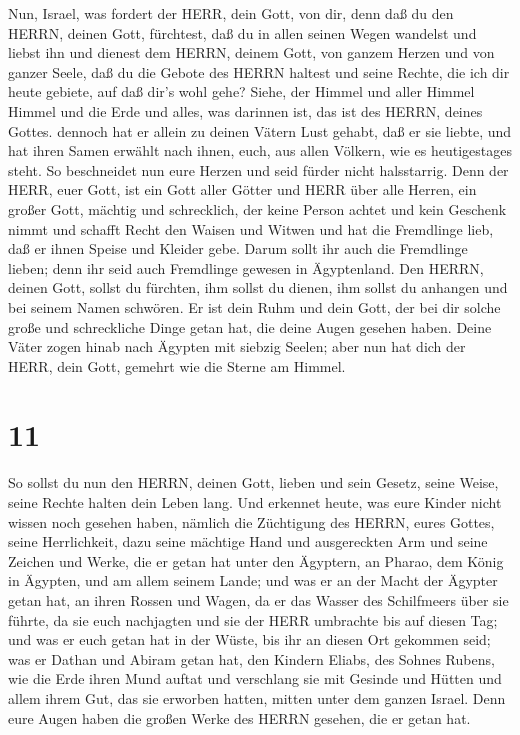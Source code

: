  Nun, Israel, was fordert der HERR, dein Gott, von dir,
denn daß du den HERRN, deinen Gott, fürchtest, daß du in allen seinen
Wegen wandelst und liebst ihn und dienest dem HERRN, deinem Gott, von
ganzem Herzen und von ganzer Seele,  daß du die Gebote des
HERRN haltest und seine Rechte, die ich dir heute gebiete, auf daß dir's
wohl gehe?  Siehe, der Himmel und aller Himmel Himmel und
die Erde und alles, was darinnen ist, das ist des HERRN, deines Gottes.
 dennoch hat er allein zu deinen Vätern Lust gehabt, daß er
sie liebte, und hat ihren Samen erwählt nach ihnen, euch, aus allen
Völkern, wie es heutigestages steht.  So beschneidet nun
eure Herzen und seid fürder nicht halsstarrig.  Denn der
HERR, euer Gott, ist ein Gott aller Götter und HERR über alle Herren,
ein großer Gott, mächtig und schrecklich, der keine Person achtet und
kein Geschenk nimmt  und schafft Recht den Waisen und
Witwen und hat die Fremdlinge lieb, daß er ihnen Speise und Kleider
gebe.  Darum sollt ihr auch die Fremdlinge lieben; denn ihr
seid auch Fremdlinge gewesen in Ägyptenland.  Den HERRN,
deinen Gott, sollst du fürchten, ihm sollst du dienen, ihm sollst du
anhangen und bei seinem Namen schwören.  Er ist dein Ruhm
und dein Gott, der bei dir solche große und schreckliche Dinge getan
hat, die deine Augen gesehen haben.  Deine Väter zogen
hinab nach Ägypten mit siebzig Seelen; aber nun hat dich der HERR, dein
Gott, gemehrt wie die Sterne am Himmel.

\hypertarget{section-10}{%
\section{11}\label{section-10}}

 So sollst du nun den HERRN, deinen Gott, lieben und sein
Gesetz, seine Weise, seine Rechte halten dein Leben lang. 
Und erkennet heute, was eure Kinder nicht wissen noch gesehen haben,
nämlich die Züchtigung des HERRN, eures Gottes, seine Herrlichkeit, dazu
seine mächtige Hand und ausgereckten Arm  und seine Zeichen
und Werke, die er getan hat unter den Ägyptern, an Pharao, dem König in
Ägypten, und am allem seinem Lande;  und was er an der Macht
der Ägypter getan hat, an ihren Rossen und Wagen, da er das Wasser des
Schilfmeers über sie führte, da sie euch nachjagten und sie der HERR
umbrachte bis auf diesen Tag;  und was er euch getan hat in
der Wüste, bis ihr an diesen Ort gekommen seid;  was er
Dathan und Abiram getan hat, den Kindern Eliabs, des Sohnes Rubens, wie
die Erde ihren Mund auftat und verschlang sie mit Gesinde und Hütten und
allem ihrem Gut, das sie erworben hatten, mitten unter dem ganzen
Israel.  Denn eure Augen haben die großen Werke des HERRN
gesehen, die er getan hat.

